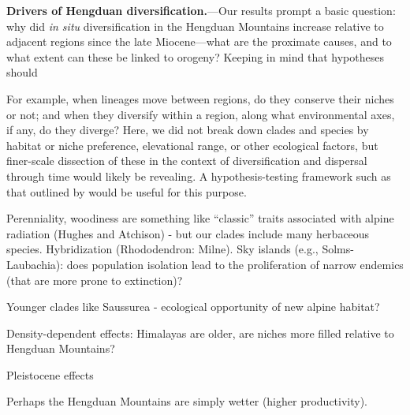 
\textbf{Drivers of Hengduan diversification.}---Our results prompt a basic question: why did \textit{in situ} diversification in the Hengduan Mountains increase relative to adjacent regions since the late Miocene---what are the proximate causes, and to what extent can these be linked to orogeny? Keeping in mind that hypotheses should 

For example, when lineages move between regions, do they conserve their niches or not; and when they diversify within a region, along what environmental axes, if any, do they diverge? Here, we did not break down clades and species by habitat or niche preference, elevational range, or other ecological factors, but finer-scale dissection of these in the context of diversification and dispersal through time would likely be revealing. A hypothesis-testing framework such as that outlined by \citet{Favre2015} would be useful for this purpose.

Perenniality, woodiness are something like ``classic'' traits associated with alpine radiation (Hughes and Atchison) - but our clades include many herbaceous species. Hybridization (Rhododendron: Milne). Sky islands (e.g., Solms-Laubachia): does population isolation lead to the proliferation of narrow endemics (that are more prone to extinction)?

Younger clades like Saussurea - ecological opportunity of new alpine habitat?

Density-dependent effects: Himalayas are older, are niches more filled relative to Hengduan Mountains?

Pleistocene effects

Perhaps the Hengduan Mountains are simply wetter (higher productivity).


